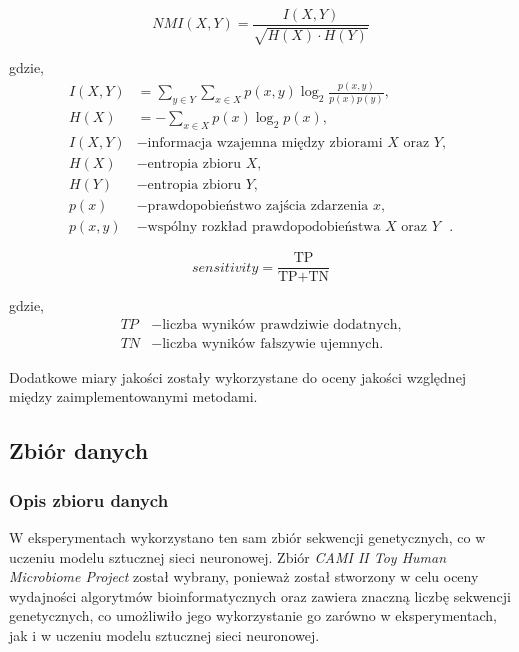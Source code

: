         \begin{equation}
            NMI(X, Y) = \frac{I(X, Y)}{\sqrt{H(X) \cdot H(Y)}}
            \label{Equation:NMI}
        \end{equation}

        gdzie,
        \begin{align*}
            I(X, Y) &= \sum_{y \in Y}{ \sum_{x \in X}{p(x, y) \log_{2}{\frac{p(x, y)}{p(x) p(y)}}}}, \\
            H(X) &= - \sum_{x \in X}{ p(x) \log_{2}{p(x)}}, \\
            I(X, Y) &- \text{informacja wzajemna między zbiorami $X$ oraz $Y$}, \\
            H(X) &- \text{entropia zbioru $X$}, \\
            H(Y) &- \text{entropia zbioru $Y$}, \\
            p(x) &- \text{prawdopobieństwo zajścia zdarzenia $x$}, \\
            p(x, y) &- \text{wspólny rozkład prawdopodobieństwa $X$ oraz $Y$ }.
        \end{align*}

        \begin{equation}
            sensitivity = \frac{\text{TP}}{
                \text{TP} + \text{TN}
            }
            \label{Equation:Sensitivity}
        \end{equation}

        gdzie,
        \begin{align*}
            TP &- \text{liczba wyników prawdziwie dodatnych,} \\
            TN &- \text{liczba wyników fałszywie ujemnych.}
        \end{align*}

        Dodatkowe miary jakości zostały wykorzystane do oceny jakości względnej między zaimplementowanymi metodami.

    \subsection{Zbiór danych}

        \subsubsection{Opis zbioru danych}
        
            W eksperymentach wykorzystano ten sam zbiór sekwencji genetycznych, co w uczeniu modelu sztucznej sieci neuronowej. Zbiór \textit{CAMI II Toy Human Microbiome Project}\cite{Fritz2019} został wybrany, ponieważ został stworzony w celu oceny wydajności algorytmów bioinformatycznych oraz zawiera znaczną liczbę sekwencji genetycznych, co umożliwiło jego wykorzystanie go zarówno w eksperymentach, jak i w uczeniu modelu sztucznej sieci neuronowej.
            

